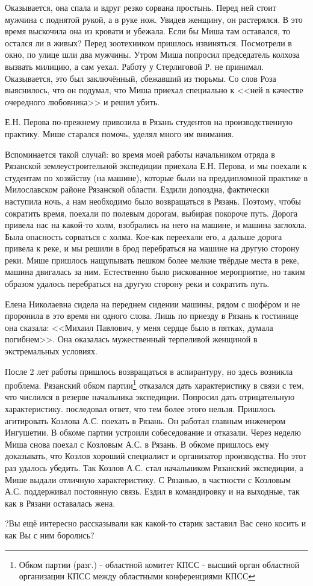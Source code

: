 Оказывается, она спала и вдруг резко сорвана простынь. Перед ней стоит мужчина с поднятой рукой, а в руке нож. Увидев женщину, он растерялся. В это время выскочила она из кровати и убежала. Если бы Миша там оставался, то остался ли в живых? Перед зоотехником пришлось извиняться. Посмотрели в окно, по улице шли два мужчины. Утром Миша попросил председатель колхоза вызвать милицию, а сам уехал. Работу у Стерлиговой Р. не принимал. Оказывается, это был заключённый, сбежавший из тюрьмы. Со слов Роза выяснилось, что он подумал, что Миша приехал специально к <<ней в качестве очередного любовника>> и решил убить.

Е.Н. Перова по-прежнему привозила в Рязань студентов на производственную практику. Мише старался помочь, уделял много им внимания.

Вспоминается такой случай: во время моей работы начальником отряда в Рязанской землеустроительной экспедиции приехала Е.Н. Перова, и мы поехали к студентам по хозяйству (на машине), которые были на преддипломной практике в Милославском районе Рязанской области. Ездили допоздна, фактически наступила ночь, а нам необходимо было возвращаться в Рязань. Поэтому, чтобы сократить время, поехали по полевым дорогам, выбирая покороче путь. Дорога привела нас на какой-то холм, взобрались на него на машине, и машина заглохла. Была опасность сорваться с холма. Кое-как переехали его, а дальше дорога привела к реке, и мы решили в брод перебраться на машине на другую сторону реки. Мише пришлось нащупывать пешком более мелкие твёрдые места в реке, машина двигалась за ним. Естественно было рискованное мероприятие, но таким образом удалось перебраться на другую сторону реки и сократить путь. 

Елена Николаевна сидела на переднем сидении машины, рядом с шофёром и не проронила в это время ни одного слова. Лишь по приезду в Рязань к гостинице она сказала: <<Михаил Павлович, у меня сердце было в пятках, думала погибнем>>. Она оказалась мужественный терпеливой женщиной в экстремальных условиях.

После 2 лет работы пришлось возвращаться в аспирантуру, но здесь возникла проблема. Рязанский обком партии\footnote{Обком партии (разг.) - областной комитет КПСС - высший орган областной организации КПСС между областными конференциями КПСС} отказался дать характеристику в связи с тем, что числился в резерве начальника экспедиции. Попросил дать отрицательную характеристику. последовал ответ, что тем более этого нельзя. Пришлось агитировать Козлова А.С. поехать в Рязань. Он работал главным инженером Ингушетии. В обкоме партии устроили собеседование и отказали. Через неделю Миша снова поехал с Козловым А.С. в Рязань. В обкоме пришлось ему доказывать, что Козлов хороший специалист и организатор производства. Но этот раз удалось убедить. Так Козлов А.С. стал начальником Рязанский экспедиции, а Мише выдали отличную характеристику. С Рязанью, в частности с Козловым А.С. поддерживал постоянную связь. Ездил в командировку и на выходные, так как в Рязани оставалась жена.

?Вы ещё интересно рассказывали как какой-то старик заставил Вас сено косить и как Вы с ним боролись?
